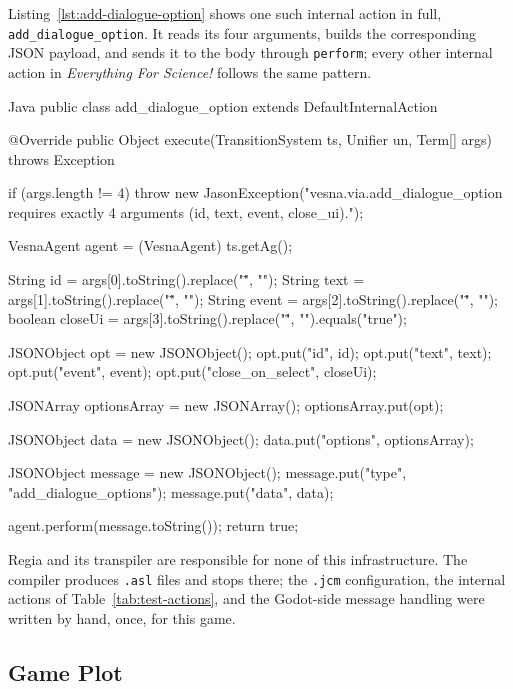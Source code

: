 Listing~\ref{lst:add-dialogue-option} shows one such internal action in full, \lstinline|add_dialogue_option|. It reads its four arguments, builds the corresponding JSON payload, and sends it to the body through \lstinline|perform|; every other internal action in \emph{Everything For Science!} follows the same pattern.

\begin{codeblock}[]{Java}
public class add_dialogue_option extends DefaultInternalAction {

    @Override
    public Object execute(TransitionSystem ts, Unifier un, Term[] args) throws Exception {
        if (args.length != 4) {
            throw new JasonException("vesna.via.add_dialogue_option requires exactly 4 arguments (id, text, event, close_ui).");
        }

        VesnaAgent agent = (VesnaAgent) ts.getAg();

        String id = args[0].toString().replace("\"", "");
        String text = args[1].toString().replace("\"", "");
        String event = args[2].toString().replace("\"", "");
        boolean closeUi = args[3].toString().replace("\"", "").equals("true");

        JSONObject opt = new JSONObject();
        opt.put("id", id);
        opt.put("text", text);
        opt.put("event", event);
        opt.put("close_on_select", closeUi);

        JSONArray optionsArray = new JSONArray();
        optionsArray.put(opt);

        JSONObject data = new JSONObject();
        data.put("options", optionsArray);

        JSONObject message = new JSONObject();
        message.put("type", "add_dialogue_options");
        message.put("data", data);

        agent.perform(message.toString());
        return true;
    }
}
\end{codeblock}

Regia and its transpiler are responsible for none of this infrastructure. The compiler produces \lstinline|.asl| files and stops there; the \lstinline|.jcm| configuration, the internal actions of Table~\ref{tab:test-actions}, and the Godot-side message handling were written by hand, once, for this game.

\subsection{Game Plot}
\label{sec:test-plot}



